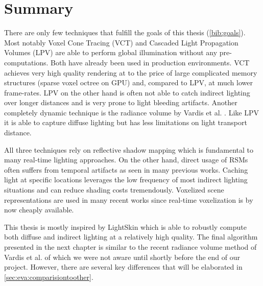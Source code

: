 \documentclass[thesis.tex]{subfiles}
\begin{document}
\section{Summary} %
There are only few techniques that fulfill the goals of this thesis (\autoref{bib:goals}).
Most notably Voxel Cone Tracing \cite{bib:voxelgi} (VCT) and Cascaded Light Propagation Volumes \cite{bib:lpt} (LPV) are able to perform global illumination without any pre-computations.
Both have already been used in production environments. %
VCT achieves very high quality rendering at to the price of large complicated memory structures (sparse voxel octree on GPU) and, compared to LPV, at much lower frame-rates.
LPV on the other hand is often not able to catch indirect lighting over longer distances and is very prone to light bleeding artifacts.
Another completely dynamic technique is the radiance volume by Vardis et al. \cite{bib:radiancecachechromaticcompression}.
Like LPV it is able to capture diffuse lighting but has less limitations on light transport distance.

All three techniques rely on reflective shadow mapping which is fundamental to many real-time lighting approaches.
On the other hand, direct usage of RSMs often suffers from temporal artifacts as seen in many previous works.
Caching light at specific locations leverages the low frequency of most indirect lighting situations and can reduce shading costs tremendously.
Voxelized scene representations are used in many recent works since real-time voxelization is by now cheaply available.

This thesis is mostly inspired by LightSkin \cite{bib:LightskinPaper} which is able to robustly compute both diffuse and indirect lighting at a relatively high quality.
The final algorithm presented in the next chapter is similar to the recent radiance volume method of Vardis et al. \cite{bib:radiancecachechromaticcompression} of which we were not aware until shortly before the end of our project.
However, there are several key differences that will be elaborated in \autoref{sec:eva:comparisiontoother}.


\subfilebib %
\end{document}
